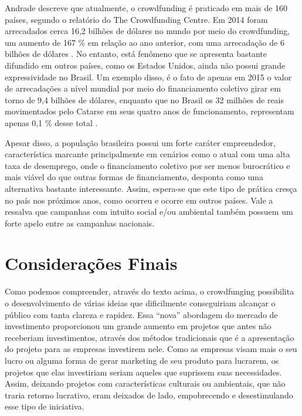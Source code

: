 \documentclass{classe_cn}                 %
\begin{document}
Andrade \cite{ANDRADE:2017} descreve que atualmente, o crowdfunding é praticado em mais de 160 países, segundo o relatório do The Crowdfunding Centre. Em 2014 foram arrecadados cerca 16,2 bilhões de dólares no mundo por meio do crowdfunding, um aumento de 167 \% em relação ao ano anterior, com uma arrecadação de 6 bilhões de dólares \cite{PASCOAL:2017}. No entanto, está fenômeno que se apresenta bastante difundido em outros países, como os Estados Unidos, ainda não possui grande expressividade no Brasil. Um exemplo disso, é o fato de apenas em 2015 o valor de arrecadações a nível mundial por meio do financiamento coletivo girar em torno de 9,4 bilhões de dólares, enquanto que no Brasil os 32 milhões de reais movimentados pelo Catarse em seus quatro anos de funcionamento, representam apenas 0,1 \% desse total \cite{ALVES:2017}.

Apesar disso, a população brasileira possui um forte caráter empreendedor, característica marcante principalmente em cenários como o atual com uma alta taxa de desemprego, onde o financiamento coletivo por ser menos burocrático e mais viável do que outras formas de financiamento, desponta como uma alternativa bastante interessante. Assim, espera-se que este tipo de prática cresça no país nos próximos anos, como ocorreu e ocorre em outros países. Vale a ressalva que campanhas com intuito social e/ou ambiental também possuem um forte apelo entre as campanhas nacionais.

\section{Considerações Finais}

Como podemos compreender, através do texto acima, o crowdfunging possibilita o desenvolvimento de várias ideias que dificilmente conseguiriam alcançar o público com tanta clareza e rapidez. Essa “nova” abordagem do mercado de investimento proporcionou um grande aumento em projetos que antes não receberiam investimentos, através dos métodos tradicionais que é a apresentação do projeto para as empresas investirem nele. Como as empresas visam mais o seu lucro ou alguma forma de gerar marketing de seu produto para lucrarem, os projetos que elas investiriam seriam aqueles que suprissem suas necessidades. Assim, deixando projetos com características culturais ou ambientais, que não traria retorno lucrativo, eram deixados de lado, empobrecendo e desestimulando esse tipo de iniciativa.
\end{document}
